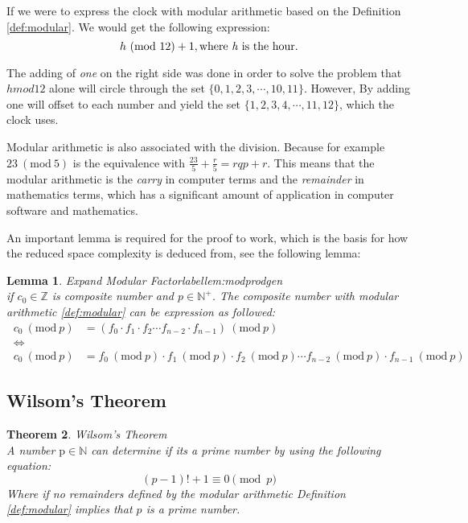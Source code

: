 \documentclass[12pt, oneside, onecolumn]{article}
\newtheorem{theorem}{Theorem}[section]
\newtheorem{lemma}[theorem]{Lemma}
\newcommand{\Mod}[1]{\ (\mathrm{mod}\ #1)}
\begin{document}
If we were to express the clock with modular arithmetic based on the Definition \ref{def:modular}. We would get the following expression:
\begin{equation}\label{equ:clock}
h\Mod{12} + 1, \text{where \emph{h} is the hour.}
\end{equation}

The adding of \emph{one} on the right side was done in order to solve the problem that $h mod 12$ alone will circle through the set $\{0,1,2,3,\cdots,10,11\}$. However, By adding one will offset to each number and yield the set $\{1,2,3,4,\cdots,11,12\}$, which the clock uses.

%
Modular arithmetic is also associated with the division. Because for example $23\Mod{5}$ is the equivalence with $\frac{23}{5} + \frac{r}{5} = rqp + r$. This means that the modular arithmetic is the \emph{carry} in computer terms and the \emph{remainder} in mathematics terms, which has a significant amount of application in computer software and mathematics.

%
An important lemma is required for the proof to work, which is the basis for how the reduced space complexity is deduced from, see the following lemma:
\begin{lemma}{Expand Modular Factor}label{lem:modprodgen}
\\
if $c_0 \in \mathbb{Z}$ is composite number and $p \in \mathbb{N}^{+}$. The composite number with modular arithmetic \ref{def:modular} can be expression as followed:
\begin{equation}\
\begin{split}
c_0 \Mod{p} &= (f_0 \cdot f_1 \cdot f_2 \cdots f_{n-2} \cdot f_{n-1} ) \Mod{p} \\
\iff \\
c_0 \Mod{p} &= f_0 \Mod{p} \cdot f_1 \Mod{p} \cdot f_2 \Mod{p} \cdots f_{n-2} \Mod{p} \cdot f_{n-1} \Mod{p}
\end{split}
\end{equation}
\end{lemma}

\subsection{Wilsom's Theorem}

\begin{theorem}{Wilsom's Theorem}\label{the:wilsomprime}
\\
A number $\text{p} \in \mathbb{N}$ can determine if its a prime number by using the following equation:
\begin{equation}
(p - 1)! + 1 \equiv 0\pmod p
\end{equation}
Where if no remainders defined by the modular arithmetic Definition \ref{def:modular} implies that $p$ is a prime number.
\end{theorem}
\end{document}
